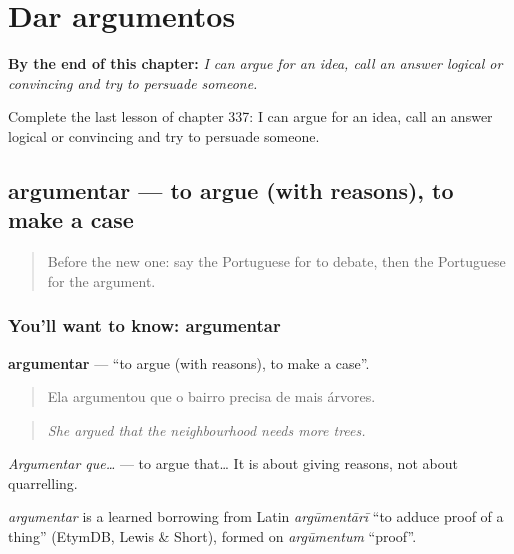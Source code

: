 
\chapter{Dar argumentos}
\label{ch:pt-dar-argumentos}

\begin{chapteropening}
\textbf{By the end of this chapter:} \emph{I can argue for an idea, call an answer logical or convincing and try to persuade someone.}

Complete the last lesson of chapter 337: I can argue for an idea, call an answer logical or convincing and try to persuade someone.
\end{chapteropening}

\section[argumentar]{argumentar — to argue (with reasons), to make a case}

\label{lesson:PT-C337-argumentar}



\begin{quote}
Before the new one: say the Portuguese for to debate, then the Portuguese for the argument.
\end{quote}

\subsection*{You'll want to know: argumentar}
\textbf{argumentar} — \textquotedblleft{}to argue (with reasons), to make a case\textquotedblright{}.

\begin{quote}
Ela argumentou que o bairro precisa de mais árvores.
\end{quote}

\begin{quote}
\emph{She argued that the neighbourhood needs more trees.}
\end{quote}

\emph{Argumentar que…} — to argue that… It is about giving reasons, not about quarrelling.

\begin{cousinweb}
\emph{argumentar} is a learned borrowing from Latin \emph{argūmentārī} \textquotedblleft{}to adduce proof of a thing\textquotedblright{} (EtymDB, Lewis \& Short), formed on \emph{argūmentum} \textquotedblleft{}proof\textquotedblright{}.
\end{cousinweb}

